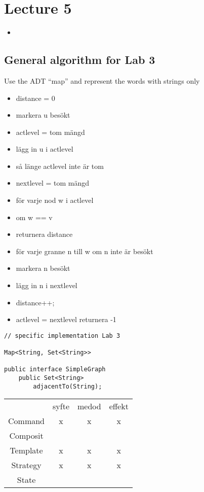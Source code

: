\documentclass[11pt]{amsart}
\begin{document}
\section{Lecture 5}
\begin{itemize}
  \item 
\end{itemize}



\subsection{General algorithm for Lab 3}
Use the ADT ``map'' and represent the words with strings only
\begin{itemize}
  \item distance = 0
  \item markera u besökt
  \item actlevel = tom mängd
  \item lägg in u i actlevel
  \item så länge actlevel inte är tom
  \item nextlevel = tom mängd
  \item för varje nod w i actlevel
  \item om w == v
  \item returnera distance
  \item för varje granne n till w om n inte är besökt
  \item markera n besökt
  \item lägg in n i nextlevel
  \item distance++;
  \item actlevel = nextlevel returnera -1
\end{itemize} 



\begin{lstlisting}
// specific implementation Lab 3

Map<String, Set<String>>

public interface SimpleGraph
	public Set<String>
		adjacentTo(String);

\end{lstlisting}



\begin{tabular}{| c | c | c | c |}
 & syfte & medod & effekt \\
 Command & x & x & x \\
 Composit &  & & \\
 Template & x & x & x \\
 Strategy & x & x & x \\
 State & & & \\
\end{tabular}
\end{document}
